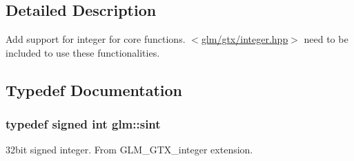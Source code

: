 \subsection{Detailed Description}
Add support for integer for core functions. $<$\hyperlink{gtx_2integer_8hpp}{glm/gtx/integer.\-hpp}$>$ need to be included to use these functionalities. 

\subsection{Typedef Documentation}
\hypertarget{group__gtx__integer_ga73643e09d8c6d362418aec541fdb987d}{
\subsubsection[{sint}]{\setlength{\rightskip}{0pt plus 5cm}typedef signed int {\bf glm\-::sint}}}\label{group__gtx__integer_ga73643e09d8c6d362418aec541fdb987d}
32bit signed integer. From G\-L\-M\-\_\-\-G\-T\-X\-\_\-integer extension. 

